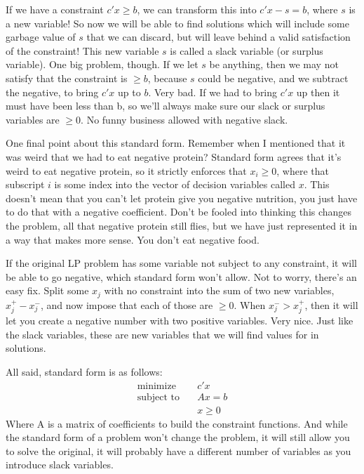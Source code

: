 \documentclass[12pt, letterpaper]{article}
\begin{document}
If we have a constraint $c'x \geq b$, we can transform this into $c'x - s = b$, where $s$ is a new variable!
So now we will be able to find solutions which will include some garbage value of $s$ that we can discard,
but will leave behind a valid satisfaction of the constraint!
This new variable $s$ is called a slack variable (or surplus variable).
One big problem, though. If we let $s$ be anything, then we may not satisfy
that the constraint is $\geq b$, because $s$ could be negative,
and we subtract the negative, to bring $c'x$ up to $b$. 
Very bad. If we had to bring $c'x$ up then it must have been less than b,
so we'll always make sure our slack or surplus variables are $\geq 0$. 
No funny business allowed with negative slack.

One final point about this standard form.
Remember when I mentioned that it was weird that we
had to eat negative protein?
Standard form agrees that it's weird to eat negative protein,
so it strictly enforces that $x_i \geq 0$, where that subscript $i$
is some index into the vector of decision variables called $x$.
This doesn't mean that you can't let protein give you negative nutrition,
you just have to do that with a negative coefficient.
Don't be fooled into thinking this changes the problem,
all that negative protein still flies, but we have just represented it
in a way that makes more sense. You don't eat negative food.

If the original LP problem has some variable not subject to any constraint,
it will be able to go negative, which standard form won't allow.
Not to worry, there's an easy fix. Split some $x_j$ with no constraint
into the sum of two new variables, $x_j^+ - x_j^-$, and now impose that each of those are $\geq 0$.
When $x_j^- > x_j^+$, then it will let you create a negative number with two positive variables. Very nice.
Just like the slack variables, these are new variables that we will find values for in solutions.

All said, standard form is as follows:
\begin{align*}
    \text{minimize} \quad &c'x \\
    \text{subject to} \quad &Ax = b \\
                      &  x\geq 0
\end{align*}
Where A is a matrix of coefficients to build the constraint functions.
And while the standard form of a problem won't change the problem, it will still allow you to 
solve the original, it will probably have a different number of variables as you introduce slack variables.
\end{document}
